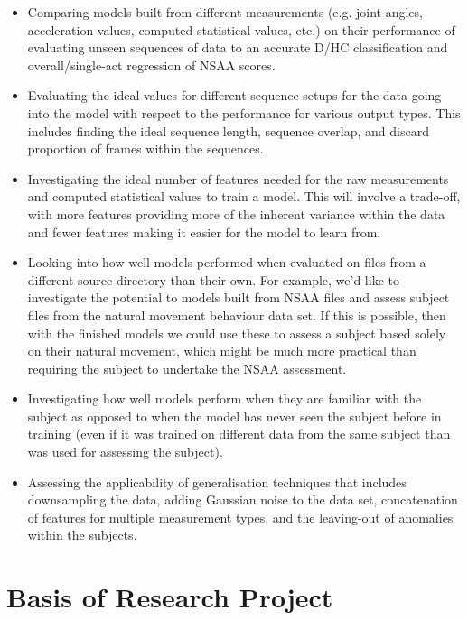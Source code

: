 \documentclass[12pt,twoside]{report}
\begin{document}
\begin{itemize}
	\item Comparing models built from different measurements (e.g. joint angles, acceleration values, computed statistical values, etc.) on their performance of evaluating unseen sequences of data to an accurate D/HC classification and overall/single-act regression of NSAA scores.
	\item Evaluating the ideal values for different sequence setups for the data going into the model with respect to the performance for various output types. This includes finding the ideal sequence length, sequence overlap, and discard proportion of frames within the sequences.
	\item Investigating the ideal number of features needed for the raw measurements and computed statistical values to train a model. This will involve a trade-off, with more features providing more of the inherent variance within the data and fewer features making it easier for the model to learn from.
	\item Looking into how well models performed when evaluated on files from a different source directory than their own. For example, we’d like to investigate the potential to models built from NSAA files and assess subject files from the natural movement behaviour data set. If this is possible, then with the finished models we could use these to assess a subject based solely on their natural movement, which might be much more practical than requiring the subject to undertake the NSAA assessment.
	\item Investigating how well models perform when they are familiar with the subject as opposed to when the model has never seen the subject before in training (even if it was trained on different data from the same subject than was used for assessing the subject).
	\item Assessing the applicability of generalisation techniques that includes downsampling the data, adding Gaussian noise to the data set, concatenation of features for multiple measurement types, and the leaving-out of anomalies within the subjects.
\end{itemize}


\chapter{Basis of Research Project\\~\\}
\end{document}
